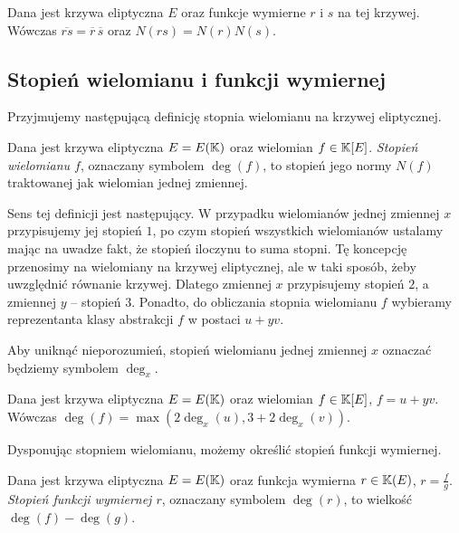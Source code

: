 \begin{fact}
Dana jest krzywa eliptyczna $E$
oraz funkcje wymierne $r$ i $s$ na tej krzywej.
Wówczas $\overline{rs} = \overline{r}\,\overline{s}$
oraz $N(rs) = N(r)N(s)$.
\end{fact}

\subsection*{Stopień wielomianu i funkcji wymiernej}

Przyjmujemy następującą definicję stopnia wielomianu na krzywej eliptycznej.

\begin{definition}
Dana jest krzywa eliptyczna $E = E(\mathbb{K})$
oraz wielomian $f \in \mathbb{K}[E]$.
\emph{Stopień wielomianu $f$},
oznaczany symbolem $\deg(f)$,
to stopień jego normy $N(f)$ traktowanej jak wielomian jednej zmiennej.
\end{definition}

Sens tej definicji jest następujący.
W przypadku wielomianów jednej zmiennej $x$
przypisujemy jej stopień $1$,
po czym stopień wszystkich wielomianów ustalamy mając na uwadze fakt,
że stopień iloczynu to suma stopni.
Tę koncepcję przenosimy na wielomiany na krzywej eliptycznej,
ale w taki sposób, żeby uwzględnić równanie krzywej.
Dlatego zmiennej $x$ przypisujemy stopień $2$,
a zmiennej $y$ -- stopień $3$.
Ponadto, do obliczania stopnia wielomianu $f$
wybieramy reprezentanta klasy abstrakcji $f$ w postaci $u + yv$.

\begin{remark}
Aby uniknąć nieporozumień,
stopień wielomianu jednej zmiennej $x$
oznaczać będziemy symbolem $\deg_x$.
\end{remark}

\begin{fact}
Dana jest krzywa eliptyczna $E = E(\mathbb{K})$
oraz wielomian $f \in \mathbb{K}[E]$, $f = u + yv$.
Wówczas $\deg(f) = \max(2\deg_x(u), 3 + 2\deg_x(v))$.
\end{fact}

Dysponując stopniem wielomianu, możemy określić stopień funkcji wymiernej.

\begin{definition}
Dana jest krzywa eliptyczna $E = E(\mathbb{K})$
oraz funkcja wymierna $r \in \mathbb{K}(E)$, $r = \frac{f}{g}$.
\emph{Stopień funkcji wymiernej $r$},
oznaczany symbolem $\deg(r)$,
to wielkość $\deg(f) - \deg(g)$.
\end{definition}

